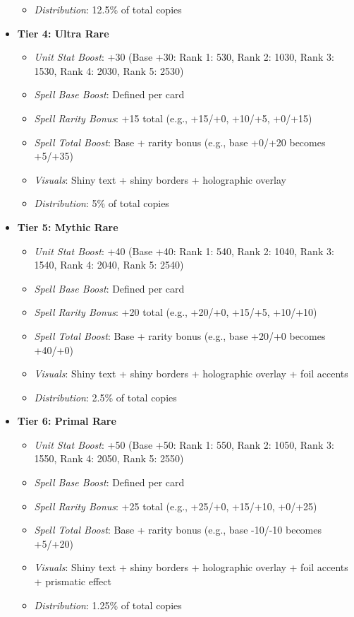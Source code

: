 \begin{itemize}
\begin{itemize}
        \item \textit{Distribution}: 12.5\% of total copies
    \end{itemize}
    \item \textbf{Tier 4: Ultra Rare}
    \begin{itemize}
        \item \textit{Unit Stat Boost}: +30 (Base +30: Rank 1: 530, Rank 2: 1030, Rank 3: 1530, Rank 4: 2030, Rank 5: 2530)
        \item \textit{Spell Base Boost}: Defined per card
        \item \textit{Spell Rarity Bonus}: +15 total (e.g., +15/+0, +10/+5, +0/+15)
        \item \textit{Spell Total Boost}: Base + rarity bonus (e.g., base +0/+20 becomes +5/+35)
        \item \textit{Visuals}: Shiny text + shiny borders + holographic overlay
        \item \textit{Distribution}: 5\% of total copies
    \end{itemize}
    \item \textbf{Tier 5: Mythic Rare}
    \begin{itemize}
        \item \textit{Unit Stat Boost}: +40 (Base +40: Rank 1: 540, Rank 2: 1040, Rank 3: 1540, Rank 4: 2040, Rank 5: 2540)
        \item \textit{Spell Base Boost}: Defined per card
        \item \textit{Spell Rarity Bonus}: +20 total (e.g., +20/+0, +15/+5, +10/+10)
        \item \textit{Spell Total Boost}: Base + rarity bonus (e.g., base +20/+0 becomes +40/+0)
        \item \textit{Visuals}: Shiny text + shiny borders + holographic overlay + foil accents
        \item \textit{Distribution}: 2.5\% of total copies
    \end{itemize}
    \item \textbf{Tier 6: Primal Rare}
    \begin{itemize}
        \item \textit{Unit Stat Boost}: +50 (Base +50: Rank 1: 550, Rank 2: 1050, Rank 3: 1550, Rank 4: 2050, Rank 5: 2550)
        \item \textit{Spell Base Boost}: Defined per card
        \item \textit{Spell Rarity Bonus}: +25 total (e.g., +25/+0, +15/+10, +0/+25)
        \item \textit{Spell Total Boost}: Base + rarity bonus (e.g., base -10/-10 becomes +5/+20)
        \item \textit{Visuals}: Shiny text + shiny borders + holographic overlay + foil accents + prismatic effect
        \item \textit{Distribution}: 1.25\% of total copies
    \end{itemize}
\end{itemize}

